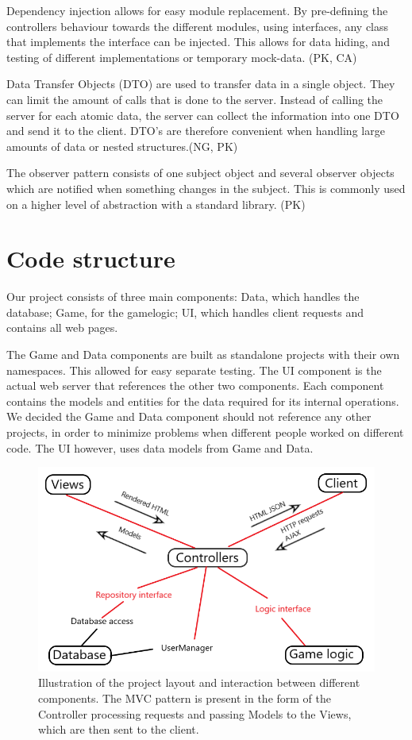 \documentclass[acmlarge, review=false, screen=true]{acmart}
\begin{document}
Dependency injection allows for easy module replacement\cite{dependency-injection}. By pre-defining the controllers behaviour towards the different modules, using interfaces, any class that implements the interface can be injected. This allows for data hiding, and testing of different implementations or temporary mock-data. (PK, CA)

Data Transfer Objects (DTO) are used to transfer data in a single object. They can limit the amount of calls that is done to the server\cite{DTOs}. Instead of calling the server for each atomic data, the server can collect the information into one DTO and send it to the client. DTO’s are therefore convenient when handling large amounts of data or nested structures.(NG, PK)

The observer pattern consists of one subject object and several observer objects which are notified when something changes in the subject\cite{Design-patterns}. This is commonly used on a higher level of abstraction with a standard library. (PK)


\section{Code structure}
Our project consists of three main components: Data, which handles the database; Game, for the gamelogic; UI, which handles client requests and contains all web pages. 

The Game and Data components are built as standalone projects with their own namespaces. This allowed for easy separate testing. The UI component is the actual web server that references the other two components. Each component contains the models and entities for the data required for its internal operations. We decided the Game and Data component should not reference any other projects, in order to minimize problems when different people worked on different code. The UI however, uses data models from Game and Data.

\begin{figure}
  \includegraphics[width=\textwidth]{images/image3.png}
  \caption{Illustration of the project layout and interaction between different components. The MVC pattern is present in the form of the Controller processing requests and passing Models to the Views, which are then sent to the client.
  }
  \label{fig:project-layout}
\end{figure}
\end{document}
